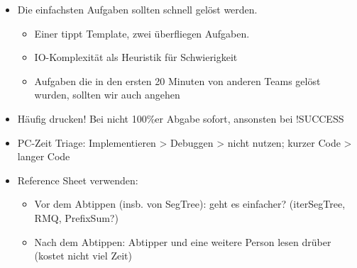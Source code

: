\begin{itemize}
	\item Die einfachsten Aufgaben sollten schnell gelöst werden.
	\begin{itemize}
		\item Einer tippt Template, zwei überfliegen Aufgaben.
		\item IO-Komplexität als Heuristik für Schwierigkeit
		\item Aufgaben die in den ersten 20 Minuten von anderen Teams gelöst wurden, sollten wir auch angehen
	\end{itemize}
	\item Häufig drucken! Bei nicht 100\%er Abgabe sofort, ansonsten bei !SUCCESS
	\item PC-Zeit Triage: Implementieren > Debuggen > nicht nutzen; kurzer Code > langer Code
	\item Reference Sheet verwenden:
	\begin{itemize}
		\item Vor dem Abtippen (insb. von SegTree): geht es einfacher? (iterSegTree, RMQ, PrefixSum?)
		\item Nach dem Abtippen: Abtipper und eine weitere Person lesen drüber (kostet nicht viel Zeit)
	\end{itemize}
\end{itemize}
